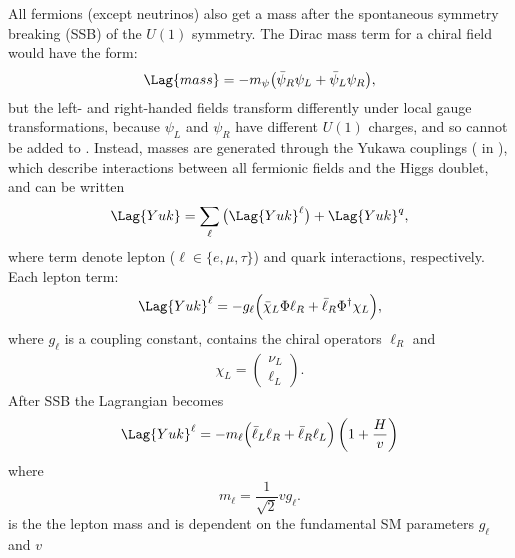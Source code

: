All fermions (except neutrinos) also get a mass after the spontaneous symmetry breaking (SSB) of
the $U(1)$ symmetry.
The Dirac mass term for a chiral field would have the form:
\begin{equation}
  \Lag{mass} = -m_\psi\big(\bar\psi_R\psi_L + \bar\psi_L\psi_R\big),
\end{equation}
but the left- and right-handed fields
transform differently under local gauge transformations,
because $\psi_L$ and $\psi_R$ have different $U(1)$ charges, %
and so cannot be added to .
Instead, masses are generated through the Yukawa couplings ( in ), which
describe interactions between all fermionic fields and the Higgs doublet, and can be written
\begin{equation}
  \Lag{Yuk} = \sum_{\ell}\big(\Lag{Yuk}^\ell\big) + \Lag{Yuk}^q,
  \label{eq:th:yukking}
\end{equation}
where term denote lepton ($\ell\in\{e,\mu,\tau\}$) and quark interactions, respectively.
%
Each lepton term:
\begin{equation}
  \Lag{Yuk}^\ell
  = - g_\ell\Big(\bar\chi_L\Phi \ell_R + \bar \ell_R\Phi^\dagger\chi_L\Big),
\end{equation}
where $g_\ell$ is a coupling constant, contains the chiral operators $\ell_R$ and
\begin{align}
  \chi_L = \begin{pmatrix}\nu_L \\ \ell_L \end{pmatrix}.
\end{align}
After SSB the Lagrangian becomes
\begin{align}
  \Lag{Yuk}^\ell
  = - m_\ell \Big(\bar\ell_L\ell_R + \bar\ell_R\ell_L\Big)%
  \left(1 + \frac{H}{v}\right)
\end{align}
where
\begin{equation}
  m_\ell = \frac{1}{\sqrt{2}}vg_\ell.
  \label{eq:leptonmass}
\end{equation}
is the the lepton mass and is dependent on the fundamental SM parameters $g_\ell$ and $v$


